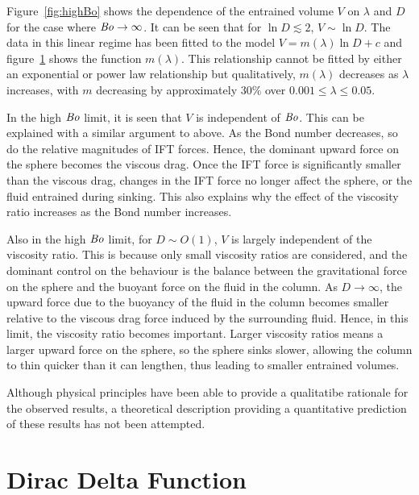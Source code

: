 \documentclass[12pt]{article}
\newcommand\Bo{\mbox{\textit{Bo}}}  %
\begin{document}
Figure~\ref{fig:highBo} shows the dependence of the entrained volume $V$ on $\lambda$ and $D$ for the case where $\Bo \to \infty$. It can be seen that for $\ln D \lesssim 2$, $V \sim \ln D$. The data in this linear regime has been fitted to the model $V = m(\lambda) \ln D + c$ and figure~\ref{fig:grad} shows the function $m(\lambda)$. This relationship cannot be fitted by either an exponential or power law relationship but qualitatively, $m(\lambda)$ decreases as $\lambda$ increases, with $m$ decreasing by approximately 30\% over $0.001 \leq \lambda \leq 0.05$. 

  \begin{figure}
    \resizebox{0.9\textwidth}{!}{\large }
    \caption{\label{fig:grad}}
  \end{figure}

In the high $\Bo$ limit, it is seen that $V$ is independent of $\Bo$. This can be explained with a similar argument to above. As the Bond number decreases, so do the relative magnitudes of IFT forces. Hence, the dominant upward force on the sphere becomes the viscous drag. Once the IFT force is significantly smaller than the viscous drag, changes in the IFT force no longer affect the sphere, or the fluid entrained during sinking. This also explains why the effect of the viscosity ratio increases as the Bond number increases. 

Also in the high $\Bo$ limit, for $D \sim O(1)$, $V$ is largely independent of the viscosity ratio. This is because only small viscosity ratios are considered, and the dominant control on the behaviour is the balance between the gravitational force on the sphere and the buoyant force on the fluid in the column. As $D \to \infty$, the upward force due to the buoyancy of the fluid in the column becomes smaller relative to the viscous drag force induced by the surrounding fluid. Hence, in this limit, the viscosity ratio becomes important. Larger viscosity ratios means a larger upward force on the sphere, so the sphere sinks slower, allowing the column to thin quicker than it can lengthen, thus leading to smaller entrained volumes.

Although physical principles have been able to provide a qualitatibe rationale for the observed results, a theoretical description providing a quantitative prediction of these results has not been attempted. 
\appendix

\section{Dirac Delta Function}
\label{app:delta}
\end{document}
